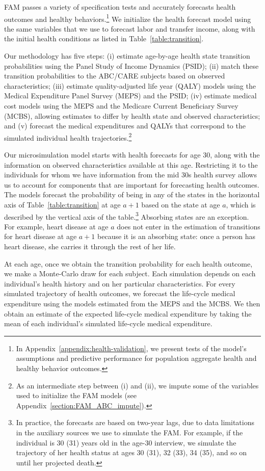 FAM passes a variety of specification tests and accurately forecasts health outcomes and healthy behaviors.\footnote{In Appendix~\ref{appendix:health-validation}, we present tests of the model's assumptions and predictive performance for population aggregate health and healthy behavior outcomes.} We initialize the health forecast model using the same variables that we use to forecast labor and transfer income, along with the initial health conditions as listed in Table~\ref{table:transition}.

Our methodology has five steps: (i) estimate age-by-age health state transition probabilities using the Panel Study of Income Dynamics (PSID); (ii) match these transition probabilities to the ABC/CARE subjects based on observed characteristics; (iii) estimate quality-adjusted life year (QALY) models using the Medical Expenditure Panel Survey (MEPS) and the PSID; (iv) estimate medical cost models using the MEPS and the Medicare Current Beneficiary Survey (MCBS), allowing estimates to differ by health state and observed characteristics; and (v) forecast the medical expenditures and QALYs that correspond to the simulated individual health trajectories.\footnote{As an intermediate step between (i) and (ii), we impute some of the variables used to initialize the FAM models (see  Appendix~\ref{section:FAM_ABC_impute}).}

Our microsimulation model starts with health forecasts for age 30, along with the information on observed characteristics available at this age. Restricting it to the individuals for whom we have information from the mid 30s health survey allows us to account for components that are important for forecasting health outcomes. The models forecast the probability of being in any of the states in the horizontal axis of Table~\ref{table:transition} at age $a+1$ based on the state at age $a$, which is described by the vertical axis of the table.\footnote{In practice, the forecasts are based on two-year lags, due to data limitations in the auxiliary sources we use to simulate the FAM. For example, if the individual is 30 (31) years old in the age-30 interview, we simulate the trajectory of her health status at ages 30 (31), 32 (33), 34 (35), and so on until her projected death.} Absorbing states are an exception. For example, heart disease at age $a$ does not enter in the estimation of transitions for heart disease at age $a+1$ because it is an absorbing state: once a person has heart disease, she carries it through the rest of her life.

At each age, once we obtain the transition probability for each health outcome, we make a Monte-Carlo draw for each subject. Each simulation depends on each individual's health history and on her particular characteristics. For every simulated trajectory of health outcomes, we forecast the life-cycle medical expenditure using the models estimated from the MEPS and the MCBS. We then obtain an estimate of the expected life-cycle medical expenditure by taking the mean of each individual's simulated life-cycle medical expenditure.

